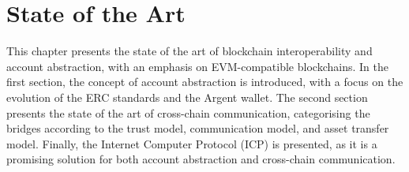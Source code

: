 \chapter{State of the Art}
\label{chap:state_of_the_art}

This chapter presents the state of the art of blockchain interoperability and account abstraction, with an emphasis on EVM-compatible blockchains.\cite{evm} In the first section, the concept of account abstraction is introduced, with a focus on the evolution of the ERC standards and the Argent wallet. The second section presents the state of the art of cross-chain communication, categorising the bridges according to the trust model, communication model, and asset transfer model. Finally, the Internet Computer Protocol (ICP) is presented, as it is a promising solution for both account abstraction and cross-chain communication. 




